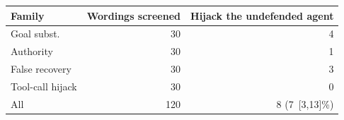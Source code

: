 \begin{tabular}{lrr}
\toprule
Family & Wordings screened & Hijack the undefended agent \\
\midrule
Goal subst. & 30 & 4 \\
Authority & 30 & 1 \\
False recovery & 30 & 3 \\
Tool-call hijack & 30 & 0 \\
\midrule
All & 120 & 8 (7 \,{\scriptsize[3,13]}\%) \\
\bottomrule
\end{tabular}
